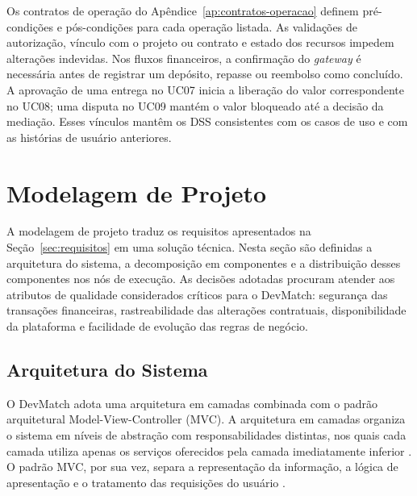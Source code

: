 \documentclass[portuguese]{sbcreviews-2025}
\begin{document}
Os contratos de operação do Apêndice~\ref{ap:contratos-operacao}
definem pré-condições e pós-condições para cada operação listada. As
validações de autorização, vínculo com o projeto ou contrato e estado
dos recursos impedem alterações indevidas. Nos fluxos financeiros, a
confirmação do \textit{gateway} é necessária antes de registrar um
depósito, repasse ou reembolso como concluído. A aprovação de uma
entrega no UC07 inicia a liberação do valor correspondente no UC08;
uma disputa no UC09 mantém o valor bloqueado até a decisão da
mediação. Esses vínculos mantêm os DSS consistentes com os casos de
uso e com as histórias de usuário anteriores.


\section{Modelagem de Projeto}
\label{sec:modelagem-projeto}

A modelagem de projeto traduz os requisitos apresentados na
Seção~\ref{sec:requisitos} em uma solução técnica. Nesta seção são
definidas a arquitetura do sistema, a decomposição em componentes e a
distribuição desses componentes nos nós de execução. As decisões
adotadas procuram atender aos atributos de qualidade considerados
críticos para o DevMatch: segurança das transações financeiras,
rastreabilidade das alterações contratuais, disponibilidade da
plataforma e facilidade de evolução das regras de negócio.


\subsection{Arquitetura do Sistema}
\label{subsec:arquitetura}

O DevMatch adota uma arquitetura em camadas combinada com o padrão
arquitetural Model-View-Controller (MVC). A arquitetura em camadas
organiza o sistema em níveis de abstração com responsabilidades
distintas, nos quais cada camada utiliza apenas os serviços oferecidos
pela camada imediatamente inferior \citep{buschmann1996}. O padrão MVC,
por sua vez, separa a representação da informação, a lógica de
apresentação e o tratamento das requisições do usuário
\citep{fowler2002}.
\end{document}
